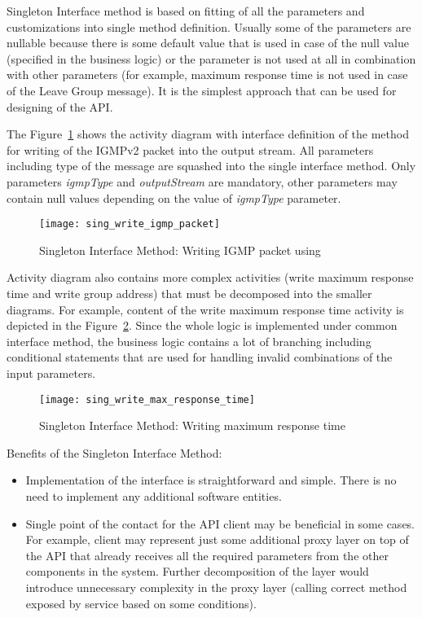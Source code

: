 Singleton Interface method is based on fitting of all the parameters and customizations into single method definition.
Usually some of the parameters are nullable because there is some default value that is used in case
of the null value (specified in the business logic) or the parameter is not used at all in combination
with other parameters (for example, maximum response time is not used in case of the Leave Group message).
It is the simplest approach that can be used for designing of the API\@.

The Figure~\ref{fig:sing_write_igmp_packet} shows the activity diagram with interface definition of the
method for writing of the IGMPv2 packet into the output stream.
All parameters including type of the message are squashed into the single interface method.
Only parameters \textit{igmpType} and \textit{outputStream} are mandatory, other parameters may contain null values
depending on the value of \textit{igmpType} parameter.

\begin{figure}[!htb]
    \centering
    \texttt{[image: sing\_write\_igmp\_packet]}
    \caption{Singleton Interface Method: Writing IGMP packet using }
    \label{fig:sing_write_igmp_packet}
\end{figure}

Activity diagram also contains more complex activities (write maximum response time and write group address)
that must be decomposed into the smaller diagrams.
For example, content of the write maximum response time activity is depicted
in the Figure~\ref{fig:sing_write_max_response_time}.
Since the whole logic is implemented under common interface method, the business logic contains a lot of branching
including conditional statements that are used for handling invalid combinations of the input parameters.

\begin{figure}[!htb]
    \centering
    \texttt{[image: sing\_write\_max\_response\_time]}
    \caption{Singleton Interface Method: Writing maximum response time}
    \label{fig:sing_write_max_response_time}
\end{figure}

Benefits of the Singleton Interface Method:

\begin{itemize}
    \item Implementation of the interface is straightforward and simple.
    There is no need to implement any additional software entities.
    \item Single point of the contact for the API client may be beneficial in some cases.
    For example, client may represent just some additional proxy layer on top of the API that
    already receives all the required parameters from the other components in the system.
    Further decomposition of the layer would introduce unnecessary complexity in the proxy layer
    (calling correct method exposed by service based on some conditions).
\end{itemize}

